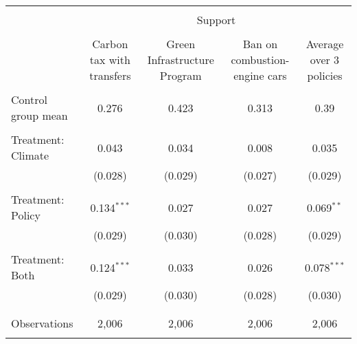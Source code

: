
\begin{tabular}{@{\extracolsep{5pt}}lcccc} 
\\[-1.8ex]\hline 
\hline \\[-1.8ex] 
 & \multicolumn{4}{c}{Support} \\ 
\cline{2-5} 
\\[-1.8ex] & Carbon tax with transfers & Green Infrastructure Program & Ban on combustion-engine cars & Average over 3 policies \\ 
\hline \\[-1.8ex] 
 Control group mean & 0.276 & 0.423 & 0.313 & 0.39  \\ \hline \\[-1.8ex] Treatment: Climate & 0.043 & 0.034 & 0.008 & 0.035 \\ 
  & (0.028) & (0.029) & (0.027) & (0.029) \\ 
  & & & & \\ 
 Treatment: Policy & 0.134$^{***}$ & 0.027 & 0.027 & 0.069$^{**}$ \\ 
  & (0.029) & (0.030) & (0.028) & (0.029) \\ 
  & & & & \\ 
 Treatment: Both & 0.124$^{***}$ & 0.033 & 0.026 & 0.078$^{***}$ \\ 
  & (0.029) & (0.030) & (0.028) & (0.030) \\ 
  & & & & \\ 
\hline \\[-1.8ex] 

Observations & 2,006 & 2,006 & 2,006 & 2,006 \\ 
\hline 
\hline \\[-1.8ex] 
\end{tabular} 